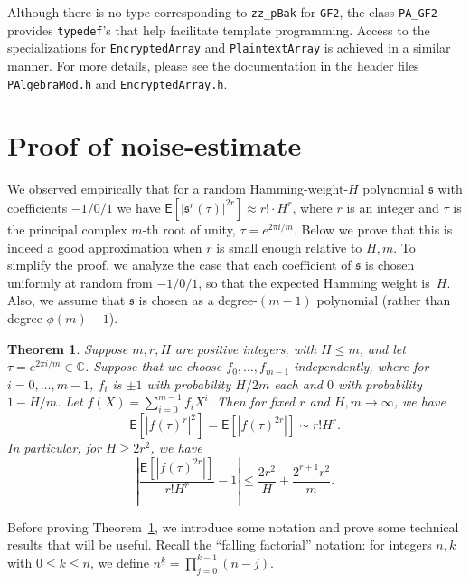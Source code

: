 \documentclass[14pt]{extarticle}
\newtheorem{theorem}{Theorem}
\newcommand{\C}{\mathbb{C}}
\def\EXP{\mathsf{E}}
\newcommand{\sk}{\mathfrak{s}}
\begin{document}
Although there is no type corresponding to \verb|zz_pBak| for
\verb|GF2|, the class \verb|PA_GF2| provides \verb|typedef|'s
that help facilitate template programming.
Access to the specializations for \verb|EncryptedArray|
and \verb|PlaintextArray| is achieved in a similar manner.
For more details, please see the documentation in the
header files \verb|PAlgebraMod.h| and \verb|EncryptedArray.h|.






\appendix

\section{Proof of noise-estimate}
We observed empirically that for a random
Hamming-weight-$H$ polynomial $\sk$ with coefficients $-1/0/1$ we have
$\EXP[|\sk^r(\tau)|^{2r}]\approx r!\cdot H^r$, where $r$ is an integer
and $\tau$ is the principal complex $m$-th root of unity,
$\tau=e^{2\pi i/m}$. Below we prove that this is indeed a
good approximation when $r$ is small enough relative to $H,m$.
To simplify the proof, we analyze the case that each coefficient of
$\sk$ is chosen uniformly at random from $-1/0/1$, so that the
expected Hamming weight is~$H$. Also, we assume that $\sk$ is chosen
as a degree-$(m-1)$ polynomial (rather than degree $\phi(m)-1$).

\begin{theorem}
\label{thm-noise}
Suppose $m,r,H$ are positive integers, with $H \le m$, and let
$\tau=e^{2\pi i/m}\in\C$. Suppose that we choose
$f_0, \ldots, f_{m-1}$ independently, where for $i = 0, \ldots, m-1$,
$f_i$ is $\pm1$ with probability $H/2m$ each and $0$ with probability
$1-H/m$. 
Let $f(X) = \sum_{i=0}^{m-1} f_i X^i$.
Then for fixed $r$ and $H, m \rightarrow \infty$, we have
\[
\EXP[ |f(\tau)^r|^2 ] 
= \EXP[ |f(\tau)^{2r}| ] 
\sim r! H^r .
\]
In particular, for $H \ge 2 r^2$, we have
\[
\left| \frac{\EXP[ |f(\tau)^{2r}| ]}{r! H^r} - 1 \right|  \le
\frac{2 r^2}{H} + \frac{2^{r+1} r^2}{m} .
\]
\end{theorem}

Before proving Theorem~\ref{thm-noise},
we introduce some notation and prove some technical results
that will be useful.
Recall the ``falling factorial'' notation: for integers
$n, k$ with $0 \le k \le n$, we define 
$n^{\underline{k}} =  \prod_{j=0}^{k-1} (n - j)$.
\end{document}
